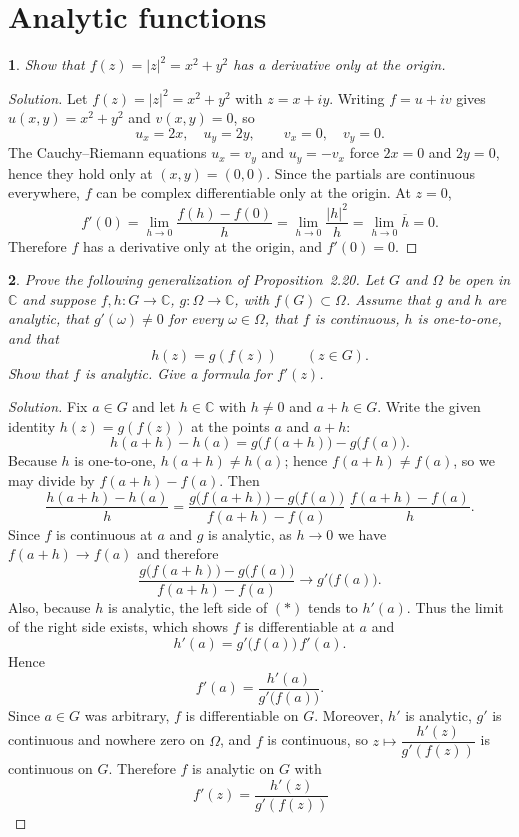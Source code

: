 \documentclass[12pt, a4paper]{report}
\theoremstyle{spaced}
\newtheorem{exercise}{}
\newcommand{\setexercise}[1]{\setcounter{exercise}{#1-1}}
\begin{document}
\section{Analytic functions}

\setexercise{1}
\begin{exercise}
	Show that \( f(z)=|z|^{2}=x^{2}+y^{2} \) has a derivative only at the origin.
\end{exercise}

\begin{proof}[Solution]
	Let \(f(z)=|z|^{2}=x^{2}+y^{2}\) with \(z=x+iy\). Writing \(f=u+iv\) gives
	\(u(x,y)=x^{2}+y^{2}\) and \(v(x,y)=0\), so
	\[
		u_x=2x,\quad u_y=2y,\qquad v_x=0,\quad v_y=0.
	\]
	The Cauchy–Riemann equations \(u_x=v_y\) and \(u_y=-v_x\) force \(2x=0\) and \(2y=0\),
	hence they hold only at \((x,y)=(0,0)\). Since the partials are continuous everywhere,
	\(f\) can be complex differentiable only at the origin.
	At \(z=0\),
	\[
		f'(0)=\lim_{h\to 0}\frac{f(h)-f(0)}{h}
		=\lim_{h\to 0}\frac{|h|^{2}}{h}
		=\lim_{h\to 0}\overline{h}=0.
	\]
	Therefore \(f\) has a derivative only at the origin, and \(f'(0)=0\). \qedhere
\end{proof}


\setexercise{10}
\begin{exercise}
	Prove the following generalization of Proposition~2.20. Let \(G\) and \(\Omega\) be open in \(\mathbb{C}\) and suppose \(f,h: G\to\mathbb{C}\), \(g:\Omega\to\mathbb{C}\), with \(f(G)\subset\Omega\). Assume that \(g\) and \(h\) are analytic, that \(g'(\omega)\neq 0\) for every \(\omega\in\Omega\), that \(f\) is continuous, \(h\) is one-to-one, and that
	\[
		h(z)=g(f(z))\qquad(z\in G).
	\]
	Show that \(f\) is analytic. Give a formula for \(f'(z)\).
\end{exercise}


\begin{proof}[Solution]
	Fix \(a\in G\) and let \(h\in\mathbb{C}\) with \(h\neq0\) and \(a+h\in G\).
	Write the given identity \(h(z)=g(f(z))\) at the points \(a\) and \(a+h\):
	\[
		h(a+h)-h(a)=g\big(f(a+h)\big)-g\big(f(a)\big).
	\]
	Because \(h\) is one-to-one, \(h(a+h)\neq h(a)\); hence \(f(a+h)\neq f(a)\), so we may divide by
	\(f(a+h)-f(a)\). Then
	\[
		\frac{h(a+h)-h(a)}{h}
		=\frac{g\big(f(a+h)\big)-g\big(f(a)\big)}{\,f(a+h)-f(a)\,}\;
		\frac{f(a+h)-f(a)}{h}.
		\tag{*}
	\]
	Since \(f\) is continuous at \(a\) and \(g\) is analytic, as \(h\to0\) we have
	\(f(a+h)\to f(a)\) and therefore
	\[
		\frac{g\big(f(a+h)\big)-g\big(f(a)\big)}{\,f(a+h)-f(a)\,}\longrightarrow g'\!\big(f(a)\big).
	\]
	Also, because \(h\) is analytic, the left side of \((*)\) tends to \(h'(a)\).
	Thus the limit of the right side exists, which shows \(f\) is differentiable at \(a\) and
	\[
		h'(a)=g'\!\big(f(a)\big)\,f'(a).
	\]
	Hence
	\[
		f'(a)=\frac{h'(a)}{g'\!\big(f(a)\big)}.
	\]
	Since \(a\in G\) was arbitrary, \(f\) is differentiable on \(G\). Moreover,
	\(h'\) is analytic, \(g'\) is continuous and nowhere zero on \(\Omega\), and \(f\) is continuous, so
	\(z\mapsto \dfrac{h'(z)}{g'(f(z))}\) is continuous on \(G\).
	Therefore \(f\) is analytic on \(G\) with
	\[
		\,f'(z)=\dfrac{h'(z)}{g'(f(z))}
	\]
\end{proof}
\end{document}
